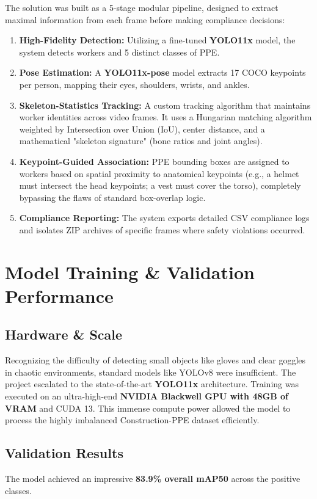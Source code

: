 \documentclass[12pt,a4paper]{article}
\begin{document}
The solution was built as a 5-stage modular pipeline, designed to extract maximal information from each frame before making compliance decisions:

\begin{enumerate}
    \item \textbf{High-Fidelity Detection:} Utilizing a fine-tuned \textbf{YOLO11x} model, the system detects workers and 5 distinct classes of PPE.
    \item \textbf{Pose Estimation:} A \textbf{YOLO11x-pose} model extracts 17 COCO keypoints per person, mapping their eyes, shoulders, wrists, and ankles.
    \item \textbf{Skeleton-Statistics Tracking:} A custom tracking algorithm that maintains worker identities across video frames. It uses a Hungarian matching algorithm weighted by Intersection over Union (IoU), center distance, and a mathematical "skeleton signature" (bone ratios and joint angles).
    \item \textbf{Keypoint-Guided Association:} PPE bounding boxes are assigned to workers based on spatial proximity to anatomical keypoints (e.g., a helmet must intersect the head keypoints; a vest must cover the torso), completely bypassing the flaws of standard box-overlap logic.
    \item \textbf{Compliance Reporting:} The system exports detailed CSV compliance logs and isolates ZIP archives of specific frames where safety violations occurred.
\end{enumerate}

\section{Model Training \& Validation Performance}

\subsection{Hardware \& Scale}
Recognizing the difficulty of detecting small objects like gloves and clear goggles in chaotic environments, standard models like YOLOv8 were insufficient. The project escalated to the state-of-the-art \textbf{YOLO11x} architecture. Training was executed on an ultra-high-end \textbf{NVIDIA Blackwell GPU with 48GB of VRAM} and CUDA 13. This immense compute power allowed the model to process the highly imbalanced Construction-PPE dataset efficiently.

\subsection{Validation Results}
The model achieved an impressive \textbf{83.9\% overall mAP50} across the positive classes. 
\end{document}
